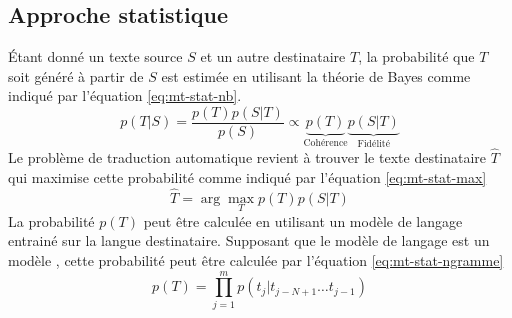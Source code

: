 \documentclass{KodeBook}
\begin{document}
\subsection{Approche statistique}

Étant donné un texte source $S$ et un autre destinataire $T$, la probabilité que $T$ soit généré à partir de $S$ est estimée en utilisant la théorie de Bayes comme indiqué par l'équation \ref{eq:mt-stat-nb}.
\begin{equation}\label{eq:mt-stat-nb} 
p(T|S) = \frac{p(T) p(S|T)}{p(S)} \propto \underbrace{p(T)}_\text{Cohérence} \underbrace{p(S|T)}_\text{Fidélité}
\end{equation}
Le problème de traduction automatique revient à trouver le texte destinataire $\hat{T}$ qui maximise cette probabilité comme indiqué par l'équation \ref{eq:mt-stat-max}
\begin{equation}\label{eq:mt-stat-max} 
\hat{T} = \arg\max_{T} p(T) p(S|T)
\end{equation}
La probabilité $p(T)$ peut être calculée en utilisant un modèle de langage entrainé sur la langue destinataire. 
Supposant que le modèle de langage est un modèle , cette probabilité peut être calculée par l'équation \ref{eq:mt-stat-ngramme}
\begin{equation}\label{eq:mt-stat-ngramme} 
p(T) = \prod_{j=1}^m p(t_j|t_{j-N+1}\ldots t_{j-1})
\end{equation}
\end{document}
